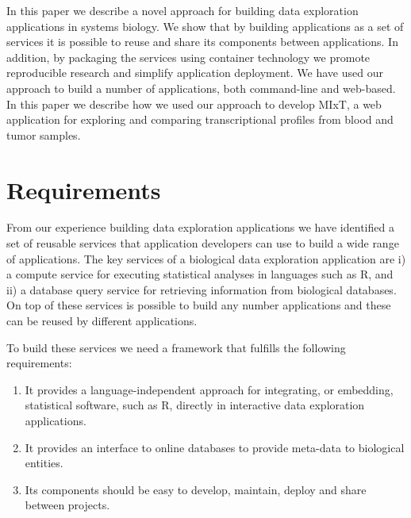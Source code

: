 

In this paper we describe a novel approach for building data exploration
applications in systems biology. We show that by building applications as a set
of services it is possible to reuse and share its components between
applications. In addition, by packaging the services using container technology
we promote reproducible research and simplify application deployment. We have
used our approach to build a number of applications, both command-line and
web-based. In this paper we describe how we used our approach to develop MIxT,
a web application for exploring and comparing transcriptional profiles from
blood and tumor samples. 


\section*{Requirements} 
From our experience building data exploration applications we have identified a
set of reusable services that application developers can use to build a wide
range of applications. The key services of a biological data exploration
application are i) a compute service for executing statistical analyses in
languages such as R, and ii) a database query service for retrieving information
from biological databases.
On top of these services is possible to build any number applications and these
can be reused by different applications. 

To build these services we need a framework that fulfills the following
requirements: 

\begin{enumerate}
    \item It provides a language-independent approach for integrating, or
        embedding, statistical software, such as R, directly in interactive data
        exploration applications.
    \item It provides an interface to online databases to provide meta-data to
        biological entities. %
    \item Its components should be easy to develop, maintain, deploy and share
        between projects. 
\end{enumerate} 


